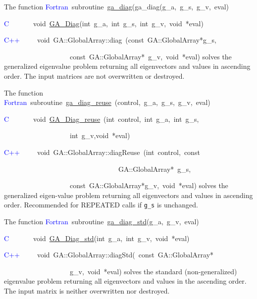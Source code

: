 The function
\textcolor{blue}{Fortran}~subroutine~\href{http://www.emsl.pnl.gov/docs/global/ga_ops.html\#ga_diag}{ga\_{}diag}(ga\_diag(g\_a,~g\_s,~g\_v,~eval)~

\textcolor{blue}{C}~~~~~~~void~\href{http://www.emsl.pnl.gov/docs/global/c_nga_ops.html\#ga_diag}{GA\_{}Diag}(int~g\_a,~int~g\_s,~int~g\_v,~void~{*}eval)

\textcolor{blue}{C++}~~~~~void~GA::GlobalArray::diag~(const~GA::GlobalArray{*}g\_s,~

~~~~~~~~~~~~~~~~~~~const~GA::GlobalArray{*}~g\_v,~void~{*}eval)
solves the generalized eigenvalue problem returning all eigenvectors
and values in ascending order. The input matrices are not overwritten
or destroyed.

The function
\textcolor{blue}{Fortran}~subroutine~\href{http://www.emsl.pnl.gov/docs/global/ga_ops.html\#ga_diag_reuse}{ga\_{}diag\_{}reuse}~(control,~g\_a,~g\_s,~g\_v,~eval)~

\textcolor{blue}{C}~~~~~~~void~\href{http://www.emsl.pnl.gov/docs/global/c_nga_ops.html\#ga_diag_reuse}{GA\_{}Diag\_{}reuse}~(int~control,~int~g\_a,~int~g\_s,

~~~~~~~~~~~~~~~~~~~int~g\_v,void~{*}eval)~

\textcolor{blue}{C++}~~~~~void~GA::GlobalArray::diagReuse~(int~control,~const

~~~~~~~~~~~~~~~~~~~~~~~~~~~~~~~~~GA::GlobalArray{*}~g\_s,~~~~~

~~~~~~~~~~~~~~~~~~~const~GA::GlobalArray{*}g\_v,~void~{*}eval)
solves the generalized eigen-value problem returning all eigenvectors
and values in ascending order. Recommended for REPEATED calls if \texttt{g\_s}
is unchanged.

The function
\textcolor{blue}{Fortran}~subroutine~\href{http://www.emsl.pnl.gov/docs/global/ga_ops.html\#ga_diag_std}{ga\_{}diag\_{}std}(g\_a,~g\_v,~eval)~

\textcolor{blue}{C}~~~~~~~void~\href{http://www.emsl.pnl.gov/docs/global/c_nga_ops.html\#ga_diag_std}{GA\_{}Diag\_{}std}(int~g\_a,~int~g\_v,~void~{*}eval)

\textcolor{blue}{C++}~~~~~void~GA::GlobalArray::diagStd(~const~GA::GlobalArray{*}~

~~~~~~~~~~~~~~~~~~~g\_v,~void~{*}eval)
solves the standard (non-generalized) eigenvalue problem returning
all eigenvectors and values in the ascending order. The input matrix
is neither overwritten nor destroyed. 



